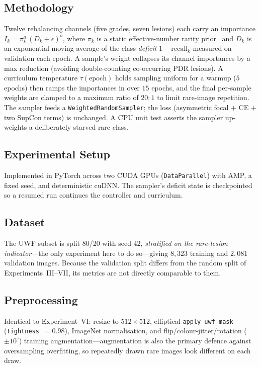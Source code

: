 \documentclass[journal,twoside,web]{ieeecolor}
\begin{document}
\subsection{Methodology}
Twelve rebalancing channels (five grades, seven lesions) each carry an importance
$I_k = \pi_k^{a}\,(D_k+\epsilon)^{b}$, where $\pi_k$ is a static effective-number
rarity prior~\cite{effnum} and $D_k$ is an exponential-moving-average of the class
\emph{deficit} $1-\mathrm{recall}_k$ measured on validation each epoch. A sample's
weight collapses its channel importances by a max reduction (avoiding
double-counting co-occurring PDR lesions). A curriculum temperature $\tau(\text{epoch})$
holds sampling uniform for a warmup ($5$ epochs) then ramps the importances in over
$15$ epochs, and the final per-sample weights are clamped to a maximum ratio of
$20{:}1$ to limit rare-image repetition. The sampler feeds a
\texttt{WeightedRandomSampler}; the loss (asymmetric focal $+$ CE $+$ two SupCon
terms) is unchanged. A CPU unit test asserts the sampler up-weights a deliberately
starved rare class.

\subsection{Experimental Setup}
Implemented in PyTorch across two CUDA GPUs (\texttt{DataParallel}) with AMP, a fixed
seed, and deterministic cuDNN. The sampler's deficit state is checkpointed so a
resumed run continues the controller and curriculum.

\subsection{Dataset}
The UWF subset is split 80/20 with seed $42$, \emph{stratified on the rare-lesion
indicator}---the only experiment here to do so---giving $8{,}323$ training and
$2{,}081$ validation images. Because the validation split differs from the random
split of Experiments~III--VII, its metrics are not directly comparable to them.

\subsection{Preprocessing}
Identical to Experiment~VI: resize to $512\times512$, elliptical
\texttt{apply\_uwf\_mask} (\texttt{tightness}~$=0.98$), ImageNet normalisation, and
flip/colour-jitter/rotation ($\pm10^{\circ}$) training augmentation---augmentation
is also the primary defence against oversampling overfitting, so repeatedly drawn
rare images look different on each draw.
\end{document}
